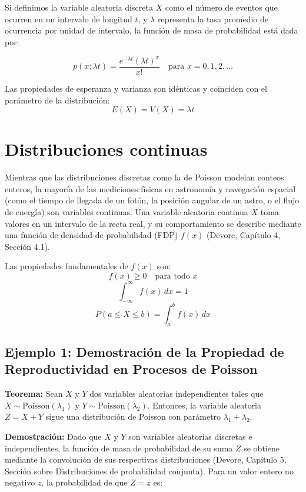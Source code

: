 Si definimos la variable aleatoria discreta $X$ como el número de eventos que ocurren en un intervalo de longitud $t$, y $\lambda$ representa la tasa promedio de ocurrencia por unidad de intervalo, la función de masa de probabilidad está dada por:

$$ p(x; \lambda t) = \frac{e^{-\lambda t} (\lambda t)^x}{x!} \quad \text{para } x = 0, 1, 2, \dots $$

Las propiedades de esperanza y varianza son idénticas y coinciden con el parámetro de la distribución:
$$ E(X) = V(X) = \lambda t $$

\section{Distribuciones continuas}

Mientras que las distribuciones discretas como la de Poisson modelan conteos enteros, la mayoría de las mediciones físicas en astronomía y navegación espacial (como el tiempo de llegada de un fotón, la posición angular de un astro, o el flujo de energía) son variables continuas. Una variable aleatoria continua $X$ toma valores en un intervalo de la recta real, y su comportamiento se describe mediante una función de densidad de probabilidad (FDP) $f(x)$ (Devore, Capítulo 4, Sección 4.1).

Las propiedades fundamentales de $f(x)$ son:
$$ f(x) \ge 0 \quad \text{para todo } x $$
$$ \int_{-\infty}^{\infty} f(x) \, dx = 1 $$
$$ P(a \le X \le b) = \int_{a}^{b} f(x) \, dx $$


\subsection{Ejemplo 1: Demostración de la Propiedad de Reproductividad en Procesos de Poisson}

\textbf{Teorema:} Sean $X$ y $Y$ dos variables aleatorias independientes tales que $X \sim \text{Poisson}(\lambda_1)$ y $Y \sim \text{Poisson}(\lambda_2)$. Entonces, la variable aleatoria $Z = X + Y$ sigue una distribución de Poisson con parámetro $\lambda_1 + \lambda_2$.

\textbf{Demostración:}
Dado que $X$ y $Y$ son variables aleatorias discretas e independientes, la función de masa de probabilidad de su suma $Z$ se obtiene mediante la convolución de sus respectivas distribuciones (Devore, Capítulo 5, Sección sobre Distribuciones de probabilidad conjunta). Para un valor entero no negativo $z$, la probabilidad de que $Z = z$ es:

